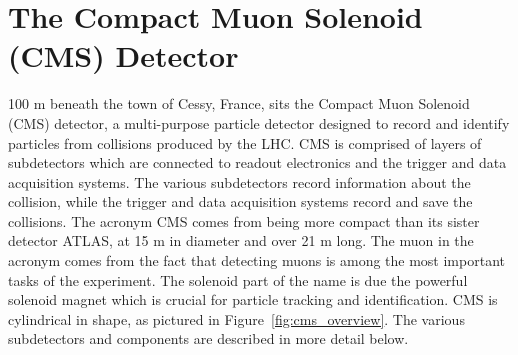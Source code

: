 \section{The Compact Muon Solenoid (CMS) Detector}
\label{sec:cms}
100 m beneath the town of Cessy, France, sits the Compact Muon Solenoid (CMS) detector, a multi-purpose particle detector designed
to record and identify particles from collisions produced by the LHC.
CMS is comprised of layers of subdetectors which are connected to readout electronics and the trigger and data acquisition systems.
The various subdetectors record information about the collision, while the trigger and
data acquisition systems record and save the collisions. The acronym CMS comes from being more compact than its sister detector ATLAS, at 15 m in diameter and
over 21 m long. The muon in the acronym comes from the fact that detecting muons is among the most important tasks of the experiment. The solenoid part of the name is due
the powerful solenoid magnet which is crucial for particle tracking and identification. 
CMS is cylindrical in shape, as pictured in Figure~\ref{fig:cms_overview}. The various subdetectors and components are described in more
detail below. 



